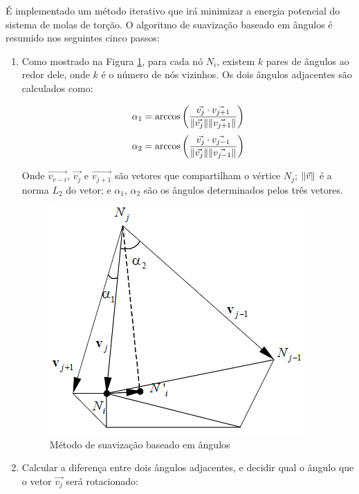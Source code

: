 É implementado um método iterativo que irá minimizar a energia potencial do sistema de molas de torção. O algoritmo de suavização baseado em ângulos é resumido nos seguintes cinco passos:

\begin{enumerate}
    \item Como mostrado na Figura \ref{fig:angle-based}, para cada nó $N_i$, existem $k$ pares de ângulos ao redor dele, onde $k$ é o número de nós vizinhos. Os dois ângulos adjacentes são calculados como:
    
    \begin{equation*}
        \alpha_1 = \arccos{\qty(\frac{\vec{v_j} \cdot \vec{v_{j+1}}}{\norm{\vec{v_j}} \norm{\vec{v_{j+1}}} })}
    \end{equation*}
    \begin{equation*}
        \alpha_2 = \arccos{\qty(\frac{\vec{v_j} \cdot \vec{v_{j-1}}}{\norm{\vec{v_j}} \norm{\vec{v_{j-1}}} })}
    \end{equation*}

    Onde $\vec{v_{v-i}}$, $\vec{v_j}$ e $\vec{v_{j+1}}$ são vetores que compartilham o vértice $N_j$; $\norm{\vec{v}}$ é a norma $L_2$ do vetor; e $\alpha_1$, $\alpha_2$ são os ângulos determinados pelos três vetores.

    \begin{figure}[]
        \centering
        \includegraphics{fig/angle-based.png}
        \caption{Método de suavização baseado em ângulos}
        \label{fig:angle-based}
    \end{figure}

    \item Calcular a diferença entre dois ângulos adjacentes, e decidir qual o ângulo que o vetor $\vec{v_j}$ será rotacionado:
    

\end{enumerate}
